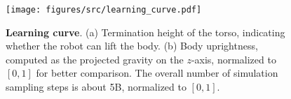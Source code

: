 \begin{figure}[ht!]
  \centering
    \texttt{[image: figures/src/learning\_curve.pdf]}
  \caption{\textbf{Learning curve}. 
  (a) Termination height of the torso, indicating whether the robot can lift the body.
  (b) Body uprightness, computed as the projected gravity on the \(z\)-axis, normalized to \([0,1]\) for better comparison.
  The overall number of simulation sampling steps is about 5B, normalized to $[0,1]$.
  }\label{fig:learning_curve}
  \vspace{-0.5cm}
\end{figure}